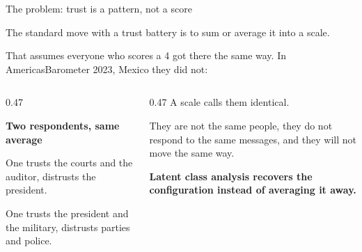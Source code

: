 \documentclass[
  ignorenonframetext,
  aspectratio=169,
]{beamer}
\newcommand{\kicker}[1]{\par\noindent{\footnotesize\color{vteal}\textbf{\MakeUppercase{#1}}}\par\vspace{0.4em}}
\begin{document}
\begin{frame}[shrink]{The problem: trust is a pattern, not a score}
\label{the-problem-trust-is-a-pattern-not-a-score}
\kicker{motivation}

\small

The standard move with a trust battery is to sum or average it into a
scale.

\vspace{0.4em}

That assumes everyone who scores a 4 got there the same way. In
AmericasBarometer 2023, Mexico they did not:

\vspace{0.5em}

\begin{columns}[T]
\begin{column}{0.47\textwidth}
\colorbox{vteal!12}{\parbox{0.95\textwidth}{\small
\textbf{Two respondents, same average}

\vspace{0.3em}
One trusts the courts and the auditor, distrusts the president.

\vspace{0.3em}
One trusts the president and the military, distrusts parties and police.}}
\end{column}
\begin{column}{0.47\textwidth}
\small
A scale calls them identical.

\vspace{0.5em}
They are not the same people, they do not respond to the same messages, and they will not move the same way.

\vspace{0.5em}
\textbf{Latent class analysis recovers the configuration instead of averaging it away.}
\end{column}
\end{columns}

\end{frame}
\end{document}
